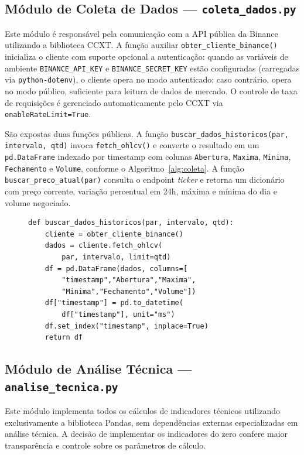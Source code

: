 \documentclass[conference]{IEEEtran}
\begin{document}
\subsection{Módulo de Coleta de Dados — \texttt{coleta\_dados.py}}

Este módulo é responsável pela comunicação com a API pública da Binance utilizando a biblioteca CCXT. A função auxiliar \texttt{obter\_cliente\_binance()} inicializa o cliente com suporte opcional a autenticação: quando as variáveis de ambiente \texttt{BINANCE\_API\_KEY} e \texttt{BINANCE\_SECRET\_KEY} estão configuradas (carregadas via \texttt{python-dotenv}), o cliente opera no modo autenticado; caso contrário, opera no modo público, suficiente para leitura de dados de mercado. O controle de taxa de requisições é gerenciado automaticamente pelo CCXT via \texttt{enableRateLimit=True}.

São expostas duas funções públicas. A função \texttt{buscar\_dados\_historicos(par, intervalo, qtd)} invoca \texttt{fetch\_ohlcv()} e converte o resultado em um \texttt{pd.DataFrame} indexado por timestamp com colunas \texttt{Abertura}, \texttt{Maxima}, \texttt{Minima}, \texttt{Fechamento} e \texttt{Volume}, conforme o Algoritmo~\ref{alg:coleta}. A função \texttt{buscar\_preco\_atual(par)} consulta o endpoint \textit{ticker} e retorna um dicionário com preço corrente, variação percentual em 24h, máxima e mínima do dia e volume negociado.

\begin{figure}[H]
\begin{lstlisting}[caption={Função de busca de dados históricos.}, label={alg:coleta}]
def buscar_dados_historicos(par, intervalo, qtd):
    cliente = obter_cliente_binance()
    dados = cliente.fetch_ohlcv(
        par, intervalo, limit=qtd)
    df = pd.DataFrame(dados, columns=[
        "timestamp","Abertura","Maxima",
        "Minima","Fechamento","Volume"])
    df["timestamp"] = pd.to_datetime(
        df["timestamp"], unit="ms")
    df.set_index("timestamp", inplace=True)
    return df
\end{lstlisting}
\end{figure}

\subsection{Módulo de Análise Técnica — \texttt{analise\_tecnica.py}}

Este módulo implementa todos os cálculos de indicadores técnicos utilizando exclusivamente a biblioteca Pandas, sem dependências externas especializadas em análise técnica. A decisão de implementar os indicadores do zero confere maior transparência e controle sobre os parâmetros de cálculo.
\end{document}
